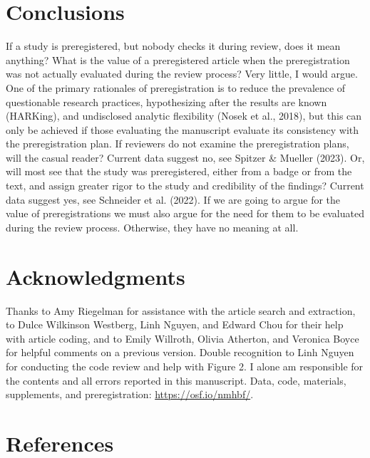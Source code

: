 \documentclass[authordate, meta, issue]{jote-new-article}
\begin{document}
	\section{Conclusions}



	If a study is preregistered, but nobody checks it during review, does it mean anything? What is the value of a preregistered article when the preregistration was not actually evaluated during the review process? Very little, I would argue. One of the primary rationales of preregistration is to reduce the prevalence of questionable research practices, hypothesizing after the results are known (HARKing), and undisclosed analytic flexibility (Nosek et al., 2018), but this can only be achieved if those evaluating the manuscript evaluate its consistency with the preregistration plan. If reviewers do not examine the preregistration plans, will the casual reader? Current data suggest no, see Spitzer \& Mueller (2023). Or, will most see that the study was preregistered, either from a badge or from the text, and assign greater rigor to the study and credibility of the findings? Current data suggest yes, see Schneider et al. (2022). If we are going to argue for the value of preregistrations we must also argue for the need for them to be evaluated during the review process. Otherwise, they have no meaning at all.



	\section{Acknowledgments}



	Thanks to Amy Riegelman for assistance with the article search and extraction, to Dulce Wilkinson Westberg, Linh Nguyen, and Edward Chou for their help with article coding, and to Emily Willroth, Olivia Atherton, and Veronica Boyce for helpful comments on a previous version. Double recognition to Linh Nguyen for conducting the code review and help with Figure 2. I alone am responsible for the contents and all errors reported in this manuscript. Data, code, materials, supplements, and preregistration: \url{https://osf.io/nmhbf/}.







	\section{References}
\end{document}
